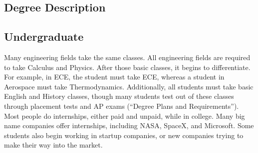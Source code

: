 \begin{multicols}{2}

\section{Degree Description}
    \subsection{Undergraduate}
        Many engineering fields take the same classes. All engineering fields are required to take Calculus and Physics. After those basic classes, it begins to differentiate. For example, in ECE, the student must take ECE, whereas a student in Aerospace must take Thermodynamics. Additionally, all students must take basic English and History classes, though many students test out of these classes through placement tests and AP exams (“Degree Plans and Requirements”). 
        Most people do internships, either paid and unpaid, while in college. Many big name companies offer internships, including NASA, SpaceX, and Microsoft. Some students also begin working in startup companies, or new companies trying to make their way into the market. 

\end{multicols}
